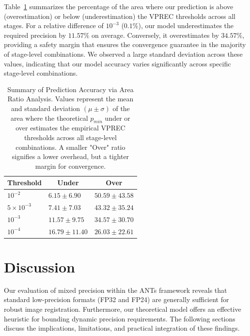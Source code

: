 \documentclass[journal,twoside,web]{ieeecolor}
\begin{document}
Table~\ref{tab:area-ratio-summary} summarizes the percentage of the area where our prediction is above (overestimation) or below (underestimation) the VPREC thresholds across all stages. For a relative difference of $10^{-3}$ ($0.1\%$), our model underestimates the required precision by $11.57\%$ on average. Conversely, it overestimates by $34.57\%$, providing a safety margin that ensures the convergence guarantee in the majority of stage-level combinations. We observed a large standard deviation across these values, indicating that our model accuracy varies significantly across specific stage-level combinations.
\begin{table}[htb!]
	\centering
	\begin{tabular}{@{}lll@{}}
		\toprule
		\multicolumn{1}{c}{\textbf{Threshold}} & \multicolumn{1}{c}{\textbf{Under}} & \multicolumn{1}{c}{\textbf{Over}} \\ \midrule
		$10^{-2}$                              & $6.15\pm6.90$                      & $50.59\pm43.58$                   \\
		$5\times10^{-3}$                       & $7.41\pm7.03$                      & $43.32\pm35.24$                   \\
		$10^{-3}$                              & $11.57\pm9.75$                     & $34.57\pm30.70$                   \\
		$10^{-4}$                              & $16.79\pm11.40$                    & $26.03\pm22.61$                   \\ \bottomrule
	\end{tabular}
	\caption{Summary of Prediction Accuracy via Area Ratio Analysis. Values represent the mean and standard deviation $(\mu \pm \sigma)$ of the area where the theoretical $p_{min}$ under or over estimates the empirical VPREC thresholds across all stage-level combinations. A smaller "Over" ratio signifies a lower overhead, but a tighter margin for convergence.}
	\label{tab:area-ratio-summary}
\end{table}

\section{Discussion}
\label{sec:discussion}
Our evaluation of mixed precision within the ANTs framework reveals that standard low-precision formats (FP32 and FP24) are generally sufficient for robust image registration. Furthermore, our theoretical model offers an effective heuristic for bounding dynamic precision requirements. The following sections discuss the implications, limitations, and practical integration of these findings.
\end{document}
